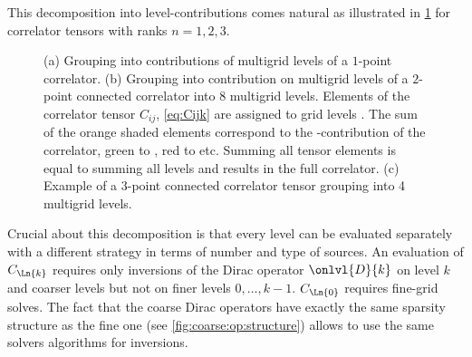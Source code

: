 This decomposition into level-contributions comes natural as illustrated in \cref{fig:mg:corr} for correlator tensors with ranks $n=1,2,3$.
% 
\begin{figure}
\centering
{}
% 
% 
% 
\caption{(a) Grouping into contributions of multigrid levels of a $1$-point correlator. (b) Grouping into contribution on multigrid levels of a $2$-point connected correlator into \num{8} multigrid levels. Elements of the correlator tensor $C_{ij}$, \cref{eq:Cijk} are assigned to grid levels . The sum of the orange shaded elements correspond to the -contribution of the correlator, green to , red to  etc. Summing all tensor elements is equal to summing all levels and results in the full correlator. (c) Example of a $3$-point connected correlator tensor grouping into \num{4} multigrid levels. \takenpart }
\label{fig:mg:corr}
\end{figure}
Crucial about this decomposition is that every level can be evaluated separately with a different strategy in terms of number and type of sources.
An evaluation of $C_{\Ln{k}}$ requires only inversions of the Dirac operator $\onlvl{D}{k}$ on level $k$ and coarser levels but not on finer levels $0, \ldots, k-1$.
$C_{\Ln{0}}$ requires fine-grid solves.
The fact that the coarse Dirac operators have exactly the same sparsity structure as the fine one (see \cref{fig:coarse:op:structure}) allows to use the same solvers algorithms for inversions.

